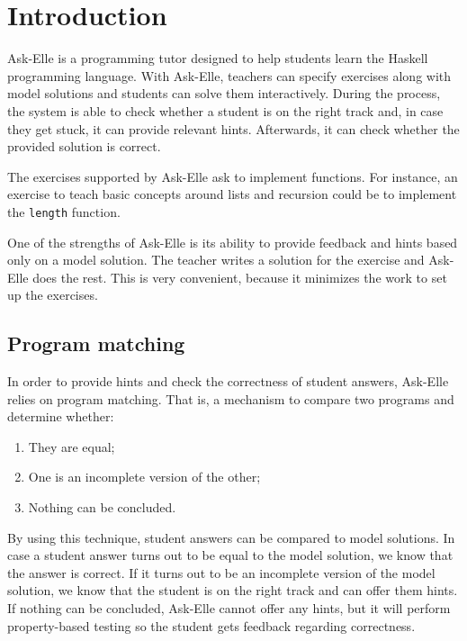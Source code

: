 \chapter{Introduction}

Ask-Elle \cite{2017askelle} is a programming tutor designed to help students learn the Haskell programming language. With Ask-Elle, teachers can specify exercises along with model solutions and students can solve them interactively. During the process, the system is able to check whether a student is on the right track and, in case they get stuck, it can provide relevant hints. Afterwards, it can check whether the provided solution is correct.

The exercises supported by Ask-Elle ask to implement functions. For instance, an exercise to teach basic concepts around lists and recursion could be to implement the \texttt{length} function.

One of the strengths of Ask-Elle is its ability to provide feedback and hints based only on a model solution. The teacher writes a solution for the exercise and Ask-Elle does the rest. This is very convenient, because it minimizes the work to set up the exercises.

\section{Program matching}

In order to provide hints and check the correctness of student answers, Ask-Elle relies on program matching. That is, a mechanism to compare two programs and determine whether:

\begin{enumerate}
    \item They are equal;
    \item One is an incomplete version of the other;
    \item Nothing can be concluded.
\end{enumerate}

By using this technique, student answers can be compared to model solutions. In case a student answer turns out to be equal to the model solution, we know that the answer is correct. If it turns out to be an incomplete version of the model solution, we know that the student is on the right track and can offer them hints. If nothing can be concluded, Ask-Elle cannot offer any hints, but it will perform property-based testing so the student gets feedback regarding correctness.

